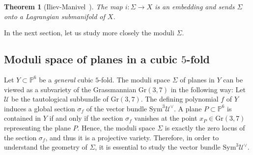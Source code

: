 \documentclass{article}
\newtheorem{theorem}{Theorem}[section]
\theoremstyle{definition}
\begin{document}
\begin{theorem}[Iliev-Manivel~\cite{IlievManivel}]
    The map $i: \Sigma \to X$ is an embedding and sends $\Sigma$ onto a Lagrangian submanifold of $X$.
\end{theorem}

In the next section, let us study more closely the moduli $\Sigma$.


\subsection{Moduli space of planes in a cubic $5$-fold}
Let $Y\subset \mathbb P^6$ be a \emph{general} cubic $5$-fold. The moduli space $\Sigma$ of planes in $Y$ can be viewed as a subvariety of the Grassmannian $\mathrm{Gr}(3, 7)$ in the following way: Let $\mathcal U$ be the tautological subbundle of $\mathrm{Gr}(3, 7)$. The defining polynomial $f$ of $Y$ induces a global section $\sigma_f$ of the vector bundle $\mathrm{Sym}^3\mathcal U^\vee$. A plane $P\subset \mathbb P^6$ is contained in $Y$ if and only if the section $\sigma_f$ vanishes at the point $x_P\in \mathrm{Gr}(3, 7)$ representing the plane $P$. Hence, the moduli space $\Sigma$ is exactly the zero locus of the section $\sigma_f$, and thus it is a projective variety. Therefore, in order to understand the geometry of $\Sigma$, it is essential to study the vector bundle $\mathrm{Sym}^3\mathcal U^\vee$.
\end{document}
